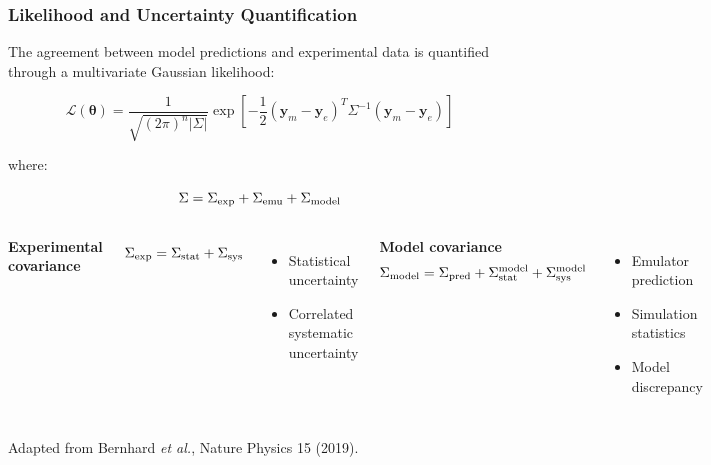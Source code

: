 \begin{frame}
\frametitle{Likelihood and Uncertainty Quantification}

\small
The agreement between model predictions and experimental data is quantified
through a multivariate Gaussian likelihood:

\vspace{0.2cm}

\[
\mathcal{L}(\boldsymbol{\theta})
=
\frac{1}
{\sqrt{(2\pi)^n |\Sigma|}}
\exp\left[
-\frac12
(\mathbf y_m-\mathbf y_e)^T
\Sigma^{-1}
(\mathbf y_m-\mathbf y_e)
\right]
\]

where:
\vspace{-0.1cm}

\[
\Sigma=\Sigma_{\rm exp}+\Sigma_{\rm emu}+\Sigma_{\rm model}
\]

\vspace{0.3cm}

\begin{columns}[T]


\textbf{Experimental covariance}

\[
\Sigma_{\rm exp}
=
\Sigma_{\rm stat}
+
\Sigma_{\rm sys}
\]

\begin{itemize}
\item Statistical uncertainty
\item Correlated systematic uncertainty
\end{itemize}


\textbf{Model covariance}
\vspace{-0.1cm}
\[
\Sigma_{\rm model}
=
\Sigma_{\rm pred}
+
\Sigma_{\rm stat}^{\rm model}
+
\Sigma_{\rm sys}^{\rm model}
\]

\begin{itemize}
\item Emulator prediction
\item Simulation statistics
\item Model discrepancy
\end{itemize}

\end{columns}

\vfill

{\tiny
Adapted from Bernhard \emph{et al.},
Nature Physics 15 (2019).
}

\end{frame}

